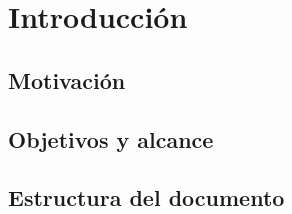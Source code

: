 \chapter{Introducción}

\section{Motivación}

\section{Objetivos y alcance}

\section{Estructura del documento}
